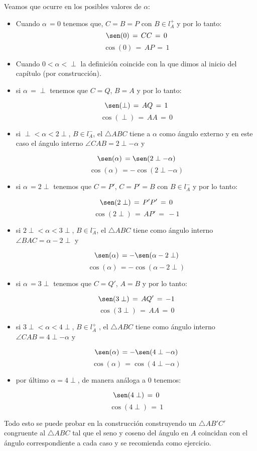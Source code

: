 \begin{obs}\label{ext} Veamos que ocurre en los posibles valores de $\alpha$:
\begin{itemize}
\item Cuando $\alpha\,=0$ tenemos que, $C=B=P$ con $B \in l_A^{+}$ y por lo tanto:
\[\sen(0)\,=\,CC\,=\,0\]
\[\cos(0)\,=\,AP\,=\,1\]
   
\item Cuando $0 < \alpha < \perp$ la definición coincide con la que dimos al inicio del capítulo (por construcción).
                   
\item si $\alpha\,=\perp$ tenemos que $C=Q$, $B=A$  y por lo tanto:
           
\[\sen(\perp)\,=\,AQ\,=\,1\]
\[\cos(\perp)\,=\,AA\,=\,0\]
  
\item si $\perp < \alpha < 2\perp$, $B \in l_A^{-}$, el $\triangle ABC$ tiene a $\alpha$ como ángulo externo y en este caso el ángulo interno $\angle CAB = 2\perp - \alpha$ y 
             
\[\sen(\alpha)\,=\sen(2\perp-\alpha)\]
\[\cos(\alpha)\,=-\cos(2\perp-\alpha)\]
              
\item si $\alpha\,=2\perp$ tenemos que $C=P'$, $C=P'=B$ con $B \in l_A^{-}$ y por lo tanto:
           
\[\sen(2\perp)\,=\,P'P'\,=\,0\]
\[\cos(2\perp)\,=\,AP'\,=\,-1\] 
              
\item si $2\perp < \alpha < 3\perp$, $B \in l_A^{-}$, el $\triangle ABC$ tiene como ángulo interno $\angle BAC = \alpha - 2\perp$ y 
             
\[\sen(\alpha)\,=-\sen(\alpha - 2\perp)\]
\[\cos(\alpha)\,=-\cos(\alpha - 2\perp)\]
                         
\item si $\alpha\,=3\perp$ tenemos que $C=Q'$, $A=B$ y por lo tanto:
           
\[\sen(3\perp)\,=\,AQ'\,=\,-1\]
\[\cos(3\perp)\,=\,AA\,=\,0\]
              
\item si $3\perp < \alpha < 4\perp$, $B \in l_A^{+}$ , el $\triangle ABC$ tiene como ángulo interno $\angle CAB = 4\perp - \alpha$ y
  
\[\sen(\alpha)\,=-\sen(4\perp-\alpha)\]
\[\cos(\alpha)\,=\cos(4\perp-\alpha)\]
  
\item por último $\alpha= 4\perp$, de manera análoga a $0$ tenemos:
  
\[\sen(4\perp)\,=\,0\]
\[\cos(4\perp)\,=\,1\]
  
\end{itemize}        
Todo esto se puede probar en la construcción construyendo un $\triangle AB'C'$ congruente al $\triangle ABC$ tal que el seno y coseno del ángulo en $A$ coincidan con el ángulo correspondiente a cada caso y se recomienda como ejercicio. 
\end{obs}

